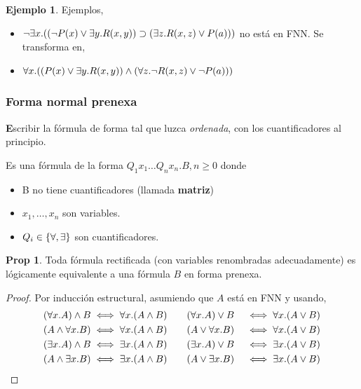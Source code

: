 \documentclass{report}
\theoremstyle{definition} %
\newtheorem*{proposition*}{Prop}
\newtheorem*{example*}{Ejemplo}
\newenvironment{nota}[1]
    {\begin{leftbar}\textbf{#1}}
    {\end{leftbar}}
\begin{document}
\begin{example*} Ejemplos,
    \begin{itemize}
        \item \(
            \neg \exists x . (
                (
                    \neg P(x) \vee \exists y . R(x, y)
                ) \supset (
                    \exists z . R(x, z) \vee P(a)
                )
            )
        \) no está en FNN. Se transforma en,
        \item \(
            \forall x . (
                (
                    P(x) \vee \exists y . R(x, y)
                ) \wedge (
                    \forall z . \neg R(x, z) \vee \neg P(a)
                )
            )
        \)
    \end{itemize}
\end{example*}

\subsubsection{Forma normal prenexa}

\begin{nota}
    Escribir la fórmula de forma tal que luzca \textit{ordenada}, con
    los cuantificadores al principio.
\end{nota}

Es una fórmula de la forma $Q_1 x_1 \dots Q_n x_n . B, n\geq 0$ donde

\begin{itemize}
    \item B no tiene cuantificadores (llamada \textbf{matriz})
    \item $x_1, \dots, x_n$ son variables.
    \item $Q_i \in \{ \forall, \exists \}$ son cuantificadores.
\end{itemize}

\begin{proposition*}
    Toda fórmula rectificada (con variables renombradas adecuadamente) es
    lógicamente equivalente a una fórmula $B$ en forma prenexa.
\end{proposition*}
\begin{proof}
    Por inducción estructural, asumiendo que $A$ está en FNN y usando,
    \begin{alignat*}{2}
        (\forall x . A) \wedge B &\iff \forall x . (A \wedge B)
        \qquad
        (\forall x . A) \vee B &&\iff \forall x . (A \vee B)\\
        (A \wedge \forall x . B) &\iff \forall x . (A \wedge B)
        \qquad
        (A \vee \forall x . B) &&\iff \forall x . (A \vee B)\\
        (\exists x . A) \wedge B &\iff \exists x . (A \wedge B)
        \qquad
        (\exists x . A) \vee B &&\iff \exists x . (A \vee B)\\
        (A \wedge \exists x . B) &\iff \exists x . (A \wedge B)
        \qquad
        (A \vee \exists x . B) &&\iff \exists x . (A \vee B)
    \end{alignat*}
\end{proof}
\end{document}
